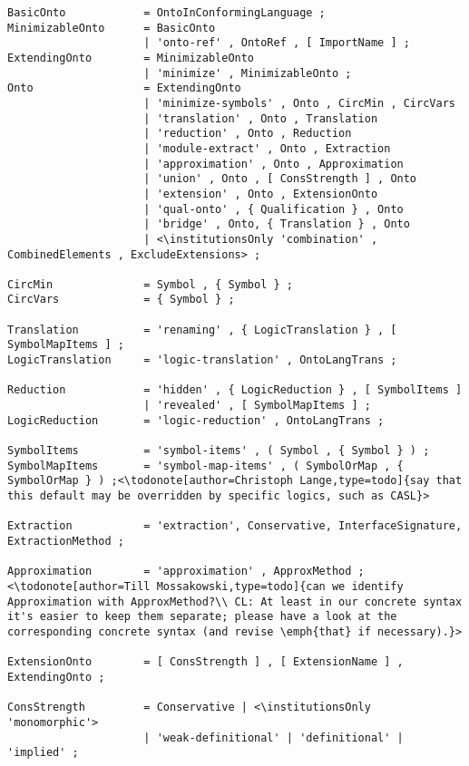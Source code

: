 \documentclass[%
\ifpretendfinal
final%
\else
draft%
\fi,
a4paper,
wd]{isov2}
\makeatletter
\newcommand*\CommentAuthor{}
\renewcommand*\CommentAuthor{#1}}
\newcommand*\CommentDate{}
\renewcommand*\CommentDate{#1}}
\newcommand*\CommentId{}
\renewcommand*\CommentId{#1}}
\newcommand*\CommentType{}
\renewcommand*\CommentType{#1}}
\newcommand*{\SetCommentColorByType}[1]{%
\edef\localType{{#1}}%
\expandafter\ifstrequal\localType{q-aut}{\colorlet{CommentColor}{red}}{%
\expandafter\ifstrequal\localType{q-all}{\colorlet{CommentColor}{orange}}{%
\expandafter\ifstrequal\localType{todo}{\colorlet{CommentColor}{orange}}{%
\expandafter\ifstrequal\localType{fyi}{\colorlet{CommentColor}{lightgray}}{%
\colorlet{CommentColor}{yellow}}}}}}
\newcommand*{\SetCommentPrefixByType}[1]{%
\edef\localType{{#1}}%
\expandafter\@ifmtarg\localType{%
\edef\CommentPrefix{}%
}{%
\caseupper[q]{#1}%
\edef\CommentPrefix{\thestring: }%
}}
\newcommand*{\initComment}[1]{%
\setkeys{Comment}{#1}%
\SetCommentColorByType{\CommentType}%
\relax%
\SetCommentPrefixByType{\CommentType}%
\relax%
}
\newcommand*{\todonote}[2][]{%
\initComment{#1}%
\pdfcomment[author=\CommentAuthor,color=CommentColor,date=\CommentDate,id=\CommentId]{%
\CommentPrefix
#2}}
\newcommand*{\todonote}[2][]{%
\initComment{#1}%
\ednote{\CommentPrefix #2}}
\newcommand*{\institutionsOnly}{\bfseries\itshape}
\makeatother
\begin{document}
\begin{lstlisting}[language=ebnf,escapeinside={<>}]
BasicOnto            = OntoInConformingLanguage ;
MinimizableOnto      = BasicOnto
                     | 'onto-ref' , OntoRef , [ ImportName ] ;
ExtendingOnto        = MinimizableOnto
                     | 'minimize' , MinimizableOnto ;
Onto                 = ExtendingOnto
                     | 'minimize-symbols' , Onto , CircMin , CircVars
                     | 'translation' , Onto , Translation
                     | 'reduction' , Onto , Reduction
                     | 'module-extract' , Onto , Extraction 
                     | 'approximation' , Onto , Approximation
                     | 'union' , Onto , [ ConsStrength ] , Onto 
                     | 'extension' , Onto , ExtensionOnto
                     | 'qual-onto' , { Qualification } , Onto
                     | 'bridge' , Onto, { Translation } , Onto
                     | <\institutionsOnly 'combination' , CombinedElements , ExcludeExtensions> ;

CircMin              = Symbol , { Symbol } ;
CircVars             = { Symbol } ;

Translation          = 'renaming' , { LogicTranslation } , [ SymbolMapItems ] ;
LogicTranslation     = 'logic-translation' , OntoLangTrans ;

Reduction            = 'hidden' , { LogicReduction } , [ SymbolItems ]
                     | 'revealed' , [ SymbolMapItems ] ;
LogicReduction       = 'logic-reduction' , OntoLangTrans ;

SymbolItems          = 'symbol-items' , ( Symbol , { Symbol } ) ;
SymbolMapItems       = 'symbol-map-items' , ( SymbolOrMap , { SymbolOrMap } ) ;<\todonote[author=Christoph Lange,type=todo]{say that this default may be overridden by specific logics, such as CASL}>

Extraction           = 'extraction', Conservative, InterfaceSignature, ExtractionMethod ;

Approximation        = 'approximation' , ApproxMethod ;<\todonote[author=Till Mossakowski,type=todo]{can we identify Approximation with ApproxMethod?\\ CL: At least in our concrete syntax it's easier to keep them separate; please have a look at the corresponding concrete syntax (and revise \emph{that} if necessary).}>

ExtensionOnto        = [ ConsStrength ] , [ ExtensionName ] , ExtendingOnto ;

ConsStrength         = Conservative | <\institutionsOnly 'monomorphic'>
                     | 'weak-definitional' | 'definitional' | 'implied' ;


\end{lstlisting}
\end{document}
